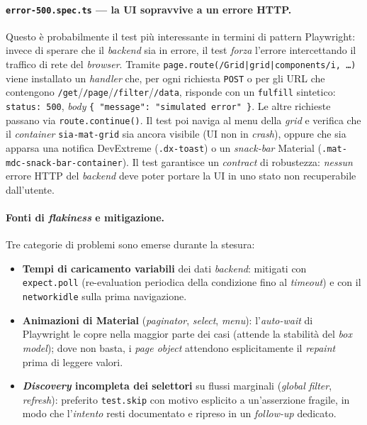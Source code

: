 \paragraph{\texttt{error-500.spec.ts} — la UI sopravvive a un errore HTTP.} Questo è probabilmente il test più interessante in termini di pattern Playwright: invece di sperare che il \emph{backend} sia in errore, il test \emph{forza} l'errore intercettando il traffico di rete del \emph{browser}. Tramite \texttt{page.route(/Grid|grid|components/i, \dots)} viene installato un \emph{handler} che, per ogni richiesta \texttt{POST} o per gli URL che contengono \texttt{/get}/\texttt{/page}/\texttt{/filter}/\texttt{/data}, risponde con un \texttt{fulfill} sintetico: \texttt{status: 500}, \emph{body} \texttt{\{ "message": "simulated error" \}}. Le altre richieste passano via \texttt{route.continue()}. Il test poi naviga al menu della \emph{grid} e verifica che il \emph{container} \texttt{sia-mat-grid} sia ancora visibile (UI non in \emph{crash}), oppure che sia apparsa una notifica DevExtreme (\texttt{.dx-toast}) o un \emph{snack-bar} Material (\texttt{.mat-mdc-snack-bar-container}). Il test garantisce un \emph{contract} di robustezza: \emph{nessun} errore HTTP del \emph{backend} deve poter portare la UI in uno stato non recuperabile dall'utente.

\paragraph{Fonti di \emph{flakiness} e mitigazione.} Tre categorie di problemi sono emerse durante la stesura:

\begin{itemize}
    \item \textbf{Tempi di caricamento variabili} dei dati \emph{backend}: mitigati con \texttt{expect.poll} (re-evaluation periodica della condizione fino al \emph{timeout}) e con il \texttt{networkidle} sulla prima navigazione.
    \item \textbf{Animazioni di Material} (\emph{paginator}, \emph{select}, \emph{menu}): l'\emph{auto-wait} di Playwright le copre nella maggior parte dei casi (attende la stabilità del \emph{box model}); dove non basta, i \emph{page object} attendono esplicitamente il \emph{repaint} prima di leggere valori.
    \item \textbf{\emph{Discovery} incompleta dei selettori} su flussi marginali (\emph{global filter}, \emph{refresh}): preferito \texttt{test.skip} con motivo esplicito a un'asserzione fragile, in modo che l'\emph{intento} resti documentato e ripreso in un \emph{follow-up} dedicato.
\end{itemize}

